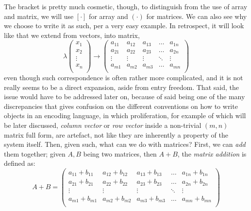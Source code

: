 The bracket is pretty much cosmetic, though, to distinguish from the use of array and matrix, we will use $[\cdot]$ for array and $(\cdot)$ for matrices. We can also see why we choose to write it as such, per a very easy example. In retrospect, it will look like that we extend from vectors, into matrix, 
\begin{equation}
    \lambda\begin{pmatrix}
        x_{1}\\
        x_{2}\\
        \vdots\\
        x_{n}\\
    \end{pmatrix}
    \to 
    \begin{pmatrix}
            a_{11} & a_{12} & a_{13} & \dots & a_{1n}\\
            a_{21} & a_{22} & a_{23} & \dots & a_{2n}\\
            \vdots & \vdots & \vdots & \ddots & \vdots \\
            a_{m1} & a_{m2} & a_{m3} & \dots & a_{mn}\\
        \end{pmatrix}
\end{equation}
even though such correspondence is often rather more complicated, and it is not really seems to be a direct expansion, aside from entry freedom. That said, the issue would have to be addressed later on, because of said being one of the many discrepancies that gives confusion on the different conventions on how to write objects in an encoding language, in which proliferation, for example of which will be later discussed, \textit{column vector} or \textit{row vector} inside a non-trivial $(m,n)$ matrix full form, are artefact, not like they are inherently a property of the system itself. Then, given such, what can we do with matrices? First, we can \textit{add} them together; given $A,B$ being two matrices, then $A+B$, the \textit{matrix addition} is defined as: 
\begin{equation}
A + B = \begin{pmatrix}
            a_{11} + b_{11} & a_{12} + b_{12} & a_{13} + b_{13}& \dots & a_{1n}+ b_{1n}\\
            a_{21} + b_{21} & a_{22} + b_{22} & a_{23} + b_{23}& \dots & a_{2n}+ b_{2n}\\
            \vdots & \vdots & \vdots & \ddots & \vdots \\
            a_{m1} + b_{m1} & a_{m2} + b_{m2} & a_{m3} + b_{m3}& \dots & a_{mn}+ b_{mn}\\
        \end{pmatrix}
\end{equation}
